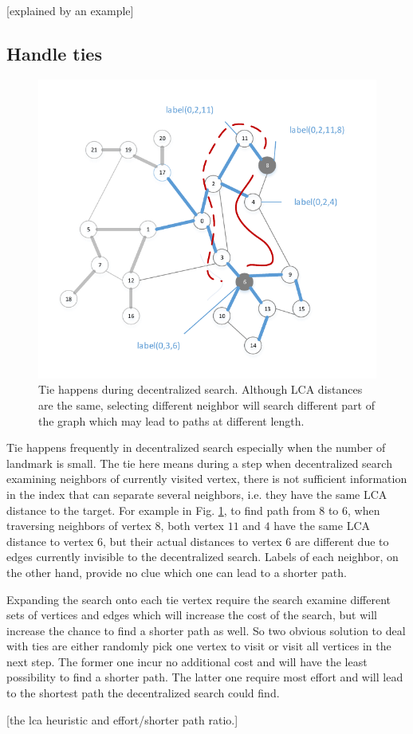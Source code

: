 [explained by an example]

\subsection{Handle ties}

\begin{figure}[t]
    \centering
    \includegraphics[width=\linewidth]{./figures/new_illustrate/tie.pdf}
    \caption{Tie happens during decentralized search. Although LCA distances are the same, selecting different neighbor will search different part of the graph which may lead to paths at different length.}
    \label{fig:tie}
\end{figure}

Tie happens frequently in decentralized search especially when the number of landmark is small. The tie here means during a step when decentralized search examining neighbors of currently visited vertex, there is not sufficient information in the index that can separate several neighbors, i.e. they have the same LCA distance to the target. For example in Fig. \ref{fig:tie}, to find path from $8$ to $6$, when traversing neighbors of vertex $8$, both vertex $11$ and $4$ have the same LCA distance to vertex $6$, but their actual distances to vertex $6$ are different due to edges currently invisible to the decentralized search. Labels of each neighbor, on the other hand, provide no clue which one can lead to a shorter path.

Expanding the search onto each tie vertex require the search examine different sets of vertices and edges which will increase the cost of the search, but will increase the chance to find a shorter path as well. So two obvious solution to deal with ties are either randomly pick one vertex to visit or visit all vertices in the next step. The former one incur no additional cost and will have the least possibility to find a shorter path. The latter one require most effort and will lead to the shortest path the decentralized search could find.

[the lca heuristic and effort/shorter path ratio.]
